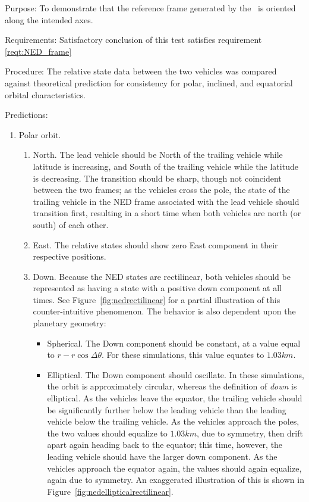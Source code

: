 \label{test:NED_frame}
\begin{description}
\item{Purpose:}\newline
To demonstrate that the reference frame generated by the \NEDDesc\ is oriented along the intended axes.

\item{Requirements:}\newline
Satisfactory conclusion of this test satisfies requirement \ref{reqt:NED_frame}

\item{Procedure:}\newline
The relative state data between the two vehicles was compared against theoretical prediction for consistency for polar, inclined, and equatorial orbital characteristics.

\item{Predictions:}
\begin{enumerate}
 \item {Polar orbit.}  
  \begin{enumerate}
   \item{North.} The lead vehicle should be North of the trailing vehicle while latitude is increasing, and South of the trailing vehicle while the latitude is decreasing.  The transition should be sharp, though not coincident between the two frames; as the vehicles cross the pole, the state of the trailing vehicle in the NED frame associated with the lead vehicle should transition first, resulting in a short time when both vehicles are north (or south) of each other. 
   \item {East.}  The relative states should show zero East component in their respective positions.
   \item {Down.}  Because the NED states are rectilinear, both vehicles should be represented as having a state with a positive down component at all times.  See Figure~\ref{fig:nedrectilinear} for a partial illustration of this counter-intuitive phenomenon.  The behavior is also dependent upon the planetary geometry:
   \begin{itemize}
    \item {Spherical.}  The Down component should be constant, at a value equal to $r - r \cos \Delta \theta$.  For these simulations, this value equates to $1.03 km$. 
    \item {Elliptical.} The Down component should oscillate.  In these simulations, the orbit is approximately circular, whereas the definition of \textit{down} is elliptical.  As the vehicles leave the equator, the trailing vehicle should be significantly further below the leading vehicle than the leading vehicle below the trailing vehicle.  As the vehicles approach the poles, the two values should equalize to $1.03 km$, due to symmetry, then drift apart again heading back to the equator; this time, however, the leading vehicle should have the larger down component.  As the vehicles approach the equator again, the values should again equalize, again due to symmetry.  An exaggerated illustration of this is shown in Figure~\ref{fig:nedellipticalrectilinear}.


\end{itemize}
\end{enumerate}
\end{enumerate}
\end{description}
